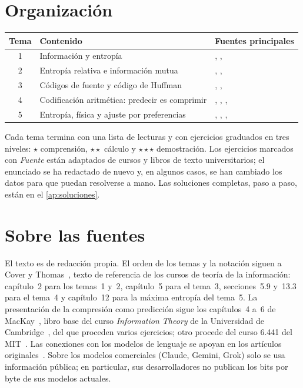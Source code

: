 \documentclass[11pt,a4paper,twoside,openany]{book}
\begin{document}
\section*{Organización}
\begin{center}
\begin{tabular}{@{}cll@{}}
\toprule
Tema & Contenido & Fuentes principales \\
\midrule
1 & Información y entropía & \cite{ct}, \cite{mackay}, \cite{shannon} \\
2 & Entropía relativa e información mutua & \cite{ct}, \cite{mackay}, \cite{camit} \\
3 & Códigos de fuente y código de Huffman & \cite{ct}, \cite{mackay}, \cite{huffman} \\
4 & Codificación aritmética: predecir es comprimir & \cite{ct}, \cite{mackay}, \cite{wnc}, \cite{deletang} \\
5 & Entropía, física y ajuste por preferencias & \cite{ct}, \cite{jaynes}, \cite{instructgpt}, \cite{dpo} \\
\bottomrule
\end{tabular}
\end{center}

Cada tema termina con una lista de lecturas y con ejercicios graduados en tres niveles: $\star$ comprensión, $\star\star$ cálculo y $\star\star\star$ demostración. Los ejercicios marcados con \emph{Fuente} están adaptados de cursos y libros de texto universitarios; el enunciado se ha redactado de nuevo y, en algunos casos, se han cambiado los datos para que puedan resolverse a mano. Las soluciones completas, paso a paso, están en el \cref{ap:soluciones}.

\section*{Sobre las fuentes}
El texto es de redacción propia. El orden de los temas y la notación siguen a Cover y Thomas~\cite{ct}, texto de referencia de los cursos de teoría de la información: capítulo~2 para los temas~1 y~2, capítulo~5 para el tema~3, secciones~5.9 y~13.3 para el tema~4 y capítulo~12 para la máxima entropía del tema~5. La presentación de la compresión como predicción sigue los capítulos~4 a~6 de MacKay~\cite{mackay}, libro base del curso \emph{Information Theory} de la Universidad de Cambridge~\cite{camit}, del que proceden varios ejercicios; otro procede del curso 6.441 del MIT~\cite{mit6441}. Las conexiones con los modelos de lenguaje se apoyan en los artículos originales~\cite{shannon51,deletang,pile,chinchilla,instructgpt,dpo}. Sobre los modelos comerciales (Claude, Gemini, Grok) solo se usa información pública; en particular, sus desarrolladores no publican los bits por byte de sus modelos actuales.
\end{document}
